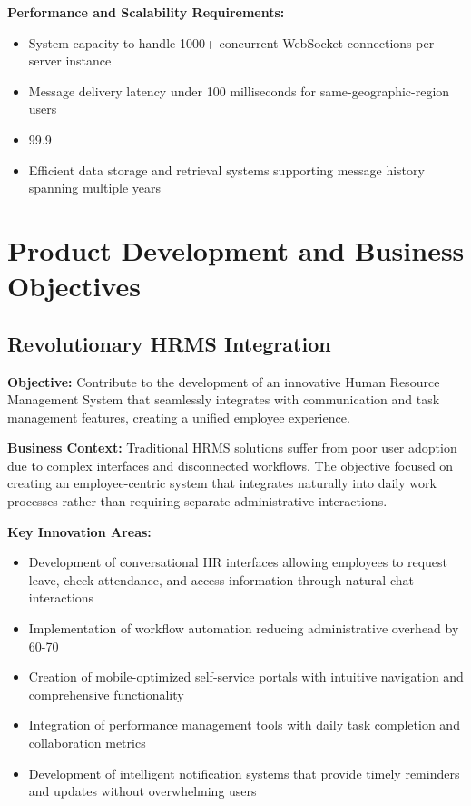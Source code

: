 \textbf{Performance and Scalability Requirements:}
\begin{itemize}
    \item System capacity to handle 1000+ concurrent WebSocket connections per server instance
    \item Message delivery latency under 100 milliseconds for same-geographic-region users
    \item 99.9%
    \item Efficient data storage and retrieval systems supporting message history spanning multiple years
\end{itemize}

\section{Product Development and Business Objectives}

\subsection{Revolutionary HRMS Integration}

\textbf{Objective:} Contribute to the development of an innovative Human Resource Management System that seamlessly integrates with communication and task management features, creating a unified employee experience.

\textbf{Business Context:} Traditional HRMS solutions suffer from poor user adoption due to complex interfaces and disconnected workflows. The objective focused on creating an employee-centric system that integrates naturally into daily work processes rather than requiring separate administrative interactions.

\textbf{Key Innovation Areas:}
\begin{itemize}
    \item Development of conversational HR interfaces allowing employees to request leave, check attendance, and access information through natural chat interactions
    \item Implementation of workflow automation reducing administrative overhead by 60-70%
    \item Creation of mobile-optimized self-service portals with intuitive navigation and comprehensive functionality
    \item Integration of performance management tools with daily task completion and collaboration metrics
    \item Development of intelligent notification systems that provide timely reminders and updates without overwhelming users
\end{itemize}

